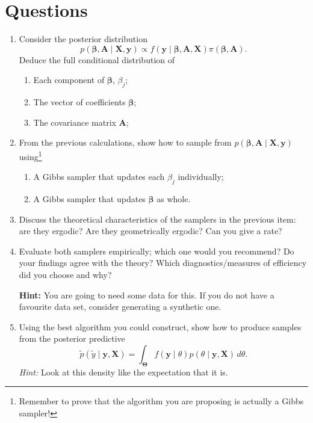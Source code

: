 \documentclass[a4paper,10pt, notitlepage]{report}
\newcommand{\bX}{ \boldsymbol{X}} %
\newcommand{\by}{ \boldsymbol{y} } %
\newcommand{\bb}{ \boldsymbol{\beta} }
\newcommand{\ba}{ \boldsymbol{A} }
\begin{document}
\section*{Questions}

\begin{enumerate}
 \item Consider the posterior distribution
 \begin{equation*}
     p\left(\bb, \ba \mid \bX, \by \right) \propto f\left(\by \mid \bb, \ba, \bX \right)\pi\left(\bb, \ba\right).
 \end{equation*}
 Deduce the full conditional distribution of
 \begin{enumerate}
     \item Each component of $\bb$, $\beta_j$;
     \item The vector of coefficients $\bb$;
     \item The covariance matrix $\ba$;
 \end{enumerate}
 \item From the previous calculations, show how to sample from $p\left(\bb, \ba \mid \bX, \by \right)$ using\footnote{Remember to prove that the algorithm you are proposing is actually a Gibbs sampler!} 
 \begin{enumerate}
     \item A Gibbs sampler that updates each $\beta_j$ individually;
     \item A Gibbs sampler that updates $\bb$ as whole.
 \end{enumerate}
 \item Discuss the theoretical characteristics of the samplers in the previous item: are they ergodic? Are they geometrically ergodic? Can you give a rate?
 \item Evaluate both samplers empirically; which one would you recommend? Do your findings agree with the theory? Which diagnostics/measures of efficiency did you choose and why?

\textbf{Hint:} You are going to need some data for this. If you do not have a favourite data set, consider generating a synthetic one.
 
 \item Using the best algorithm you could construct, show how to produce samples from the posterior predictive
\begin{equation*}
    \tilde{p}(\tilde{y} \mid \boldsymbol{y}, \bX) = \int_{\boldsymbol{\Theta}} f(\by \mid \theta) p(\theta \mid \by, \bX)\,d\theta.
\end{equation*}
 \textit{Hint:} Look at this density like the expectation that it is.
 \end{enumerate}
% 
% 
% 
\end{document}

